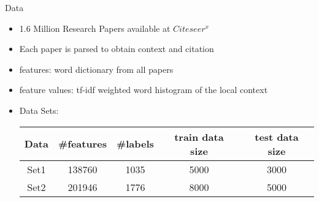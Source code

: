 \documentclass{beamer}
\begin{document}
\begin{frame}{Data}
  \begin{itemize}
    \item 1.6 Million Research Papers available at $Citeseer^{x}$
    \item Each paper is parsed to obtain context and citation
    \item features: word dictionary from all papers
    \item feature values: tf-idf weighted word histogram of the local context
    \item Data Sets:
     \newline
      \begin{tabular}{|c|c|c|c|c|}
         \hline
         Data & \#features  & \#labels & train data size & test data size\\ \hline
         Set1 & 138760 & 1035 & 5000 & 3000\\ \hline
         Set2 & 201946 & 1776 & 8000 & 5000 \\ \hline
      \end{tabular}

  \end{itemize}
\end{frame}
\end{document}
